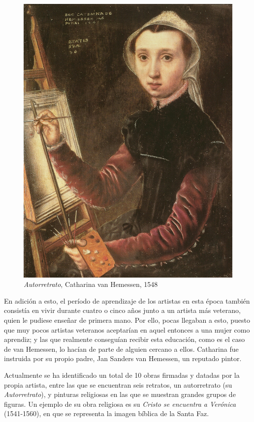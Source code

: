 \documentclass[12pt]{book}
\begin{document}
\begin{figure}
	\begin{center}
		\includegraphics[width=0.9\linewidth]{self-portrait}
		\caption{\textit{Autorretrato}, Catharina van Hemessen, 1548}
		\label{fig:wrapfig}
	\end{center}
\end{figure}

En adición a esto, el período de aprendizaje de los artistas en esta época también consistía en vivir durante cuatro o cinco años junto a un artista más veterano, quien le pudiese enseñar de primera mano. Por ello, pocas llegaban a esto, puesto que muy pocos artistas veteranos aceptarían en aquel entonces a una mujer como aprendiz; y las que realmente conseguían recibir esta educación, como es el caso de van Hemessen, lo hacían de parte de alguien cercano a ellos. Catharina fue instruida por su propio padre, Jan Sanders van Hemessen, un reputado pintor.\bigskip

Actualmente se ha identificado un total de 10 obras firmadas y datadas por la propia artista, entre las que se encuentran seis retratos, un autorretrato (su \textit{Autorretrato}), y pinturas religiosas en las que se muestran grandes grupos de figuras. Un ejemplo de su obra religiosa es su \textit{Cristo se encuentra a Verónica} (1541-1560), en que se representa la imagen bíblica de la Santa Faz.
\end{document}
